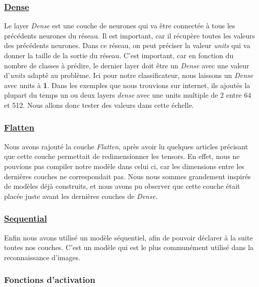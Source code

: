 \documentclass{rapport}
\begin{document}
            \subsubsection{\href{https://keras.io/api/layers/core_layers/dense/}{Dense}}
            Le layer \textit{Dense} est une couche de neurones qui va être connectée à tous les précédents neurones du réseau. Il est important, car il récupère toutes les valeurs des précédents neurones. Dans ce réseau, on peut préciser la valeur \textit{units} qui va donner la taille de la sortie du réseau. C'est important, car en fonction du nombre de classes à prédire, le dernier layer doit être un \textit{Dense} avec une valeur d'\textit{units} adapté au problème. Ici pour notre classificateur, nous laissons un \textit{Dense} avec units à \textbf{1}. Dans les exemples que nous trouvions sur internet, ils ajoutés la plupart du temps un ou deux layers \textit{dense} avec une units multiple de 2 entre 64 et 512. Nous allons donc tester des valeurs dans cette échelle. 
        
            \subsubsection{\href{https://keras.io/api/models/sequential/}{Flatten}}
            Nous avons rajouté la couche \textit{Flatten}, après avoir lu quelques articles précisant que cette couche permettait de redimensionner les tensors. En effet, nous ne pouvions pas compiler notre modèle dans celui ci, car les dimensions entre les dernières couches ne correspondait pas. Nous nous sommes grandement inspirés de modèles déjà construits, et nous avons pu observer que cette couche était placée juste avant les dernières couches de \textit{Dense}.
            
            \subsubsection{\href{https://keras.io/api/models/sequential/}{Sequential}}
            Enfin nous avons utilisé un modèle séquentiel, afin de pouvoir déclarer à la suite toutes nos couches. C'est un modèle qui est le plus communément utilisé dans la reconnaissance d'images.
            
            \subsubsection{Fonctions d'activation}
            
\end{document}

